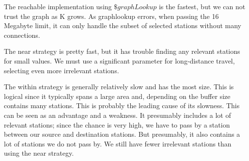 The reachable implementation using $\$graphLookup$ is the fastest, but we can not trust the graph as K grows. As graphlookup errors, when passing the 16 Megabyte limit, it can only handle the subset of selected stations without many connections. 

The near strategy is pretty fast, but it has trouble finding any relevant stations for small values. We must use a significant parameter for long-distance travel, selecting even more irrelevant stations. 

The within strategy is generally relatively slow and has the most size. This is logical since it typically spans a large area and, depending on the buffer size contains many stations. This is probably the leading cause of its slowness. This can be seen as an advantage and a weakness. It presumably includes a lot of relevant stations; since the chance is very high, we have to pass by a station between our source and destination stations. But presumably, it also contains a lot of stations we do not pass by. We still have fewer irrelevant stations than using the near strategy. 